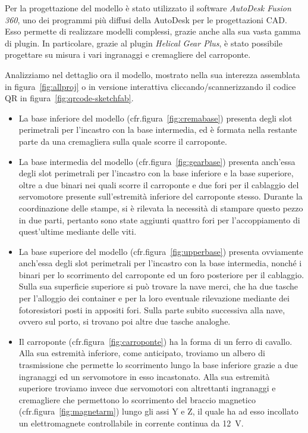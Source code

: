 Per la progettazione del modello è stato utilizzato il software \emph{AutoDesk Fusion 360}, uno dei
programmi più diffusi della AutoDesk per le progettazioni CAD. Esso permette di realizzare modelli
complessi, grazie anche alla sua vasta gamma di plugin. In particolare, grazie al plugin
\emph{Helical Gear Plus}, è stato possibile progettare su misura i vari ingranaggi e cremagliere del
carroponte.

Analizziamo nel dettaglio ora il modello, mostrato nella sua interezza assemblata in
figura~\ref{fig:allproj} o in versione interattiva cliccando/scannerizzando il codice QR in
figura~\ref{fig:qrcode-sketchfab}.
\begin{itemize}
    \item La base inferiore del modello (cfr.\@ figura~\ref{fig:cremabase}) presenta degli slot perimetrali per l'incastro con la base
        intermedia, ed è formata nella restante parte da una cremagliera sulla quale scorre il carroponte.
    \item La base intermedia del modello (cfr.\@ figura~\ref{fig:gearbase}) presenta anch'essa degli
        slot perimetrali per l'incastro con la base inferiore e la base superiore, oltre a due
        binari nei quali scorre il carroponte e due fori per il cablaggio del servomotore presente
        sull'estremità inferiore del carroponte stesso. Durante la coordinazione delle stampe, si è
        rilevata la necessità di stampare questo pezzo in due parti, pertanto sono state aggiunti
        quattro fori per l'accoppiamento di quest'ultime mediante delle viti.
    \item La base superiore del modello (cfr.\@ figura~\ref{fig:upperbase}) presenta ovviamente
        anch'essa degli slot perimetrali per l'incastro con la base intermedia, nonché i binari per
        lo scorrimento del carroponte ed un foro posteriore per il cablaggio.
        Sulla sua superficie superiore si può trovare la nave merci, che ha due tasche per
        l'alloggio dei container e per la loro eventuale rilevazione mediante dei fotoresistori
        posti in appositi fori. Sulla parte subito successiva alla nave, ovvero sul porto, si trovano poi altre due tasche analoghe.
    \item Il carroponte (cfr.\@ figura~\ref{fig:carroponte}) ha la forma di un ferro di cavallo.
        Alla sua estremità inferiore, come anticipato, troviamo un albero di trasmissione che
        permette lo scorrimento lungo la base inferiore grazie a due ingranaggi ed un servomotore in
        esso incastonato. Alla sua estremità superiore troviamo invece due servomotori con
        altrettanti ingranaggi e cremagliere che permettono lo scorrimento del braccio magnetico
        (cfr.\@ figura~\ref{fig:magnetarm}) lungo gli assi Y e Z, il quale ha ad esso incollato un
        elettromagnete controllabile in corrente continua da \qty{12}{\volt}.
\end{itemize}

